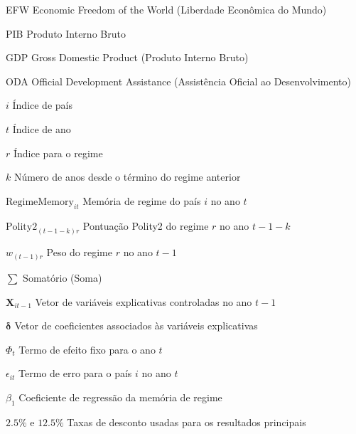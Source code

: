 
\listoffigures*
\cleardoublepage



\listoftables*
\cleardoublepage

\begin{siglas}
	\item[EFW] Economic Freedom of the World (Liberdade Econômica do Mundo)
	\item[PIB] Produto Interno Bruto
	\item[GDP] Gross Domestic Product (Produto Interno Bruto)
	\item[ODA] Official Development Assistance (Assistência Oficial ao Desenvolvimento)
\end{siglas}



\begin{simbolos}
	  \item[$i$] Índice de país
	  \item[$t$] Índice de ano
	  \item[$r$] Índice para o regime
	  \item[$k$] Número de anos desde o término do regime anterior
	  \item[$\text{RegimeMemory}_{it}$] Memória de regime do país \(i\) no ano \(t\)
	  \item[$\text{Polity2}_{(t-1-k)r}$] Pontuação Polity2 do regime \(r\) no ano \(t-1-k\)
	  \item[$w_{(t-1)r}$] Peso do regime \(r\) no ano \(t-1\)
	  \item[$\sum$] Somatório (Soma)
	  \item[$\mathbf{X}_{it-1}$] Vetor de variáveis explicativas controladas no ano \(t-1\)
	  \item[$\boldsymbol{\delta}$] Vetor de coeficientes associados às variáveis explicativas
	  \item[$\Phi_t$] Termo de efeito fixo para o ano \(t\)
	  \item[$\epsilon_{it}$] Termo de erro para o país \(i\) no ano \(t\)
	  \item[$\beta_1$] Coeficiente de regressão da memória de regime
	  \item[$2.5\%$ e $12.5\%$] Taxas de desconto usadas para os resultados principais
\end{simbolos}

